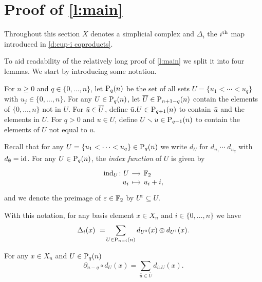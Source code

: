 
\section{Proof of \cref{l:main}} \label{s:proof}

Throughout this section $X$ denotes a simplicial complex and $\Delta_i$ the $i\th$ map introduced in \cref{d:cup-i coproducts}.

To aid readability of the relatively long proof of \cref{l:main} we split it into four lemmas.
We start by introducing some notation.

\begin{definition}
	For $n \geq0$ and $q \in \{0, \dots, n\}$, let $\P_q(n)$ be the set of all sets $U = \{u_1 < \cdots < u_q\}$ with $u_j \in \{0, \dots, n\}$.
	For any $U \in \P_q(n)$, let $\overline{U} \in \P_{n+1-q}(n)$ contain the elements of $\{0, \dots, n\}$ not in $U$. For $\bu \in \overline{U}$, define $\bu.U \in \P_{q+1}(n)$ to contain $\bu$ and the elements in $U$.
	For $q > 0$ and $u \in U$, define $U \sm u \in \P_{q-1}(n)$ to contain the elements of $U$ not equal to $u$.
\end{definition}

Recall that for any $U = \{u_1 < \cdots < u_q\} \in \P_q(n)$ we write $d_U$ for $d_{u_1} \cdots \; d_{u_q}$ with $d_{\emptyset} = \id$.
For any $U \in \P_q(n)$, the \textit{index function} of $U$ is given by
\begin{equation*}
\begin{tikzcd}[row sep=-3pt, column sep=small,
/tikz/column 1/.append style={anchor=base east},
/tikz/column 2/.append style={anchor=base west}]
\ind_U \colon U \arrow[r] & \F_2 \\
u_i \arrow[r, mapsto] & u_i + i,
\end{tikzcd}
\end{equation*}
and we denote the preimage of $\varepsilon \in \F_2$ by $U^\varepsilon \subseteq U$.

With this notation, for any basis element $x \in X_n$ and $i \in \{0, \dots, n\}$ we have
\begin{equation*}
\Delta_{i}(x)\ =\! \sum_{U \in \P_{n-i}(n)} d_{U^0}(x) \otimes d_{U^1}(x).
\end{equation*}

\begin{lemma} \label{l:partial dU = dxU}
	For any $x \in X_n$ and $U \in \P_{q}(n)$
	\begin{equation} \label{lemma1: existence:eq1}
	\partial_{n-q} \circ d_U(x) = \sum_{\bar{u} \in \overline{U}} d_{\bar{u}.U}(x).
	\end{equation}
\end{lemma}

